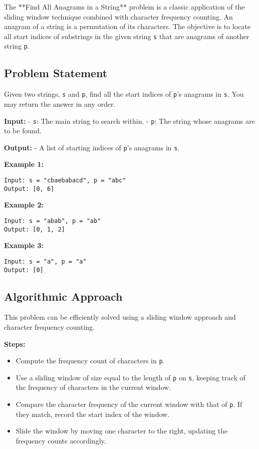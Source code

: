 
\label{problem:Find_All_Anagrams_in_a_String}

The **Find All Anagrams in a String** problem is a classic application of the sliding window technique combined with character frequency counting. An anagram of a string is a permutation of its characters. The objective is to locate all start indices of substrings in the given string \texttt{s} that are anagrams of another string \texttt{p}.

\subsection*{Problem Statement}
Given two strings, \texttt{s} and \texttt{p}, find all the start indices of \texttt{p}'s anagrams in \texttt{s}. You may return the answer in any order.

\textbf{Input:}
- \texttt{s}: The main string to search within.
- \texttt{p}: The string whose anagrams are to be found.

\textbf{Output:}
- A list of starting indices of \texttt{p}'s anagrams in \texttt{s}.

\textbf{Example 1:}
\begin{verbatim}
Input: s = "cbaebabacd", p = "abc"
Output: [0, 6]
\end{verbatim}

\textbf{Example 2:}
\begin{verbatim}
Input: s = "abab", p = "ab"
Output: [0, 1, 2]
\end{verbatim}

\textbf{Example 3:}
\begin{verbatim}
Input: s = "a", p = "a"
Output: [0]
\end{verbatim}

\subsection*{Algorithmic Approach}
This problem can be efficiently solved using a sliding window approach and character frequency counting.

\textbf{Steps:}
\begin{itemize}
    \item Compute the frequency count of characters in \texttt{p}.
    \item Use a sliding window of size equal to the length of \texttt{p} on \texttt{s}, keeping track of the frequency of characters in the current window.
    \item Compare the character frequency of the current window with that of \texttt{p}. If they match, record the start index of the window.
    \item Slide the window by moving one character to the right, updating the frequency counts accordingly.
\end{itemize}

